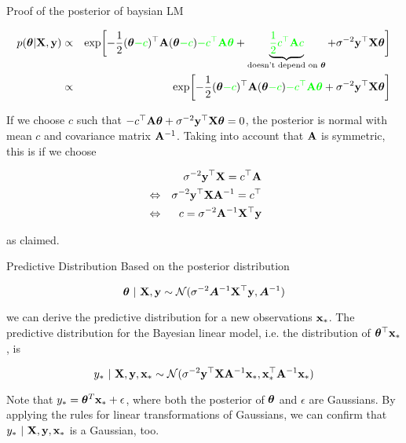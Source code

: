 \documentclass[11pt,compress,t,notes=noshow, xcolor=table]{beamer}
\begin{document}
\begin{vbframe}{Proof of the posterior of baysian LM}
\begin{footnotesize}
    \begin{eqnarray*}
    	p(\bm{\theta} | \mathbf{X}, \mathbf{y}) &\propto&  \exp\biggl[-\frac{1}{2}(\bm{\theta} \textcolor{green}{- c})^\top\mathbf{A}  (\bm{\theta} \textcolor{green}{- c}) \textcolor{green}{- c^\top \mathbf{A} \bm{\theta}} + \underbrace{\textcolor{green}{\frac{1}{2}c^\top\mathbf{A} c}}_{\text{doesn't depend on } \bm{\theta}} +\sigma^{-2} \mathbf{y}^\top \mathbf{X} \bm{\theta}\biggr] \\
    	&\propto& \exp\biggl[-\frac{1}{2}(\bm{\theta} \textcolor{green}{- c})^\top\mathbf{A}  (\bm{\theta} \textcolor{green}{- c}) \textcolor{green}{- c^\top \mathbf{A} \bm{\theta}} +\sigma^{-2} \mathbf{y}^\top \mathbf{X} \bm{\theta}\biggr]
    \end{eqnarray*}
    
    If we choose $c$ such that $- c^\top \mathbf{A} \bm{\theta} +\sigma^{-2} \mathbf{y}^\top \mathbf{X} \bm{\theta} = 0$, the posterior is normal with mean $c$ and covariance matrix $\mathbf{A}^{-1}$. Taking into account that $\mathbf{A}$ is symmetric, this is if we choose
    
    \begin{eqnarray*}
    && \sigma^{-2} \mathbf{y}^\top \mathbf{X} = c^\top\mathbf{A} \\
    &\Leftrightarrow & \sigma^{-2} \mathbf{y}^\top \mathbf{X} \mathbf{A}^{-1} = c^\top \\
    &\Leftrightarrow& c = \sigma^{-2} \mathbf{A}^{-1} \mathbf{X}^\top \mathbf{y}
    \end{eqnarray*}
    
    as claimed.
    
    \end{footnotesize}
\end{vbframe}

\begin{vbframe}{Predictive Distribution}
    Based on the posterior distribution 
    
    $$
    \bm{\theta} ~|~ \mathbf{X}, \mathbf{y} \sim \mathcal{N}(\sigma^{-2}\bm{A}^{-1}\mathbf{X}^\top\mathbf{y}, \bm{A}^{-1})
    $$
    
    we can derive the predictive distribution for a new observations $\mathbf{x}_*$. The predictive distribution for the Bayesian linear model, i.e. the distribution of $\bm{\theta}^\top \mathbf{x}_*$, is 
    
    $$
    y_* ~|~ \mathbf{X}, \mathbf{y}, \mathbf{x}_* \sim \mathcal{N}(\sigma^{-2}\mathbf{y}^\top \mathbf{X} \mathbf{A}^{-1}\mathbf{x}_*, \mathbf{x}_*^\top\mathbf{A}^{-1}\mathbf{x}_*)
    $$

    Note that $y_* = \bm{\theta}^T \mathbf{x}_* + \epsilon$, where both the posterior of $\bm{\theta}$ and $\epsilon$ are Gaussians. By applying the rules for linear transformations of Gaussians, we can confirm that $y_* ~|~ \mathbf{X}, \mathbf{y}, \mathbf{x}_*$ is a Gaussian, too. 
\end{vbframe}
\end{document}
